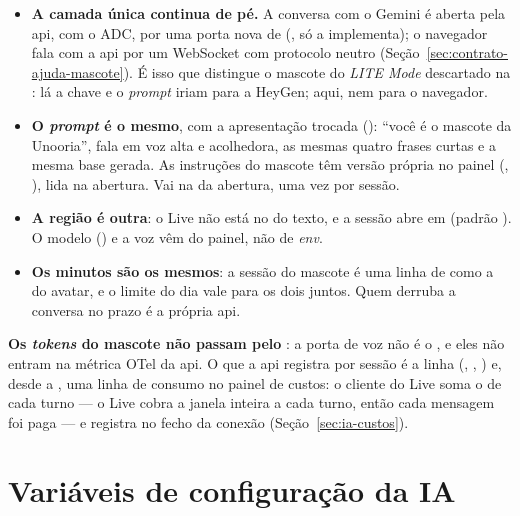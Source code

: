 \begin{itemize}
  \item \textbf{A camada única continua de pé.} A conversa com o Gemini é aberta
    pela api, com o ADC, por uma porta nova de 
    (, só  a implementa); o
    navegador fala com a api por um WebSocket com protocolo neutro
    (Seção~\ref{sec:contrato-ajuda-mascote}). É isso que distingue o mascote do
    \emph{LITE Mode} descartado na : lá a chave e o \emph{prompt}
    iriam para a HeyGen; aqui, nem para o navegador.
  \item \textbf{O \emph{prompt} é o mesmo}, com a apresentação trocada
    (): \enquote{você é o
    mascote da Unooria}, fala em voz alta e acolhedora, as mesmas quatro frases
    curtas e a mesma base gerada. As instruções do mascote têm versão própria
    no painel (, ), lida na abertura. Vai
    na  da abertura, uma vez por sessão.
  \item \textbf{A região é outra}: o Live não está no  do texto, e
    a sessão abre em  (padrão ). O
    modelo () e a voz vêm do painel, não de \emph{env}.
  \item \textbf{Os minutos são os mesmos}: a sessão do mascote é uma linha de
     como a do avatar, e o limite do dia vale para os dois
    juntos. Quem derruba a conversa no prazo é a própria api.
\end{itemize}

\begin{limitacao}
\textbf{Os \emph{tokens} do mascote não passam pelo }: a
porta de voz não é o , e eles não entram na métrica OTel da api.
O que a api registra por sessão é a linha  (,
, ) e, desde a , uma linha de consumo no
painel de custos: o cliente do Live soma o  de cada turno ---
o Live cobra a janela inteira a cada turno, então cada mensagem foi paga --- e
registra no fecho da conexão (Seção~\ref{sec:ia-custos}).
\end{limitacao}

\section{Variáveis de configuração da IA}

